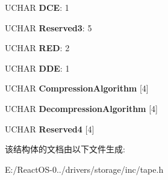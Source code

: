 \begin{DoxyCompactItemize}
U\+C\+H\+AR {\bfseries D\+CE}\+: 1
\item 
\mbox{\label{struct___m_o_d_e___d_a_t_a___c_o_m_p_r_e_s_s_i_o_n___p_a_g_e_a5013be5212448b5da50a08f44ed4dbeb}} 
U\+C\+H\+AR {\bfseries Reserved3}\+: 5
\item 
\mbox{\label{struct___m_o_d_e___d_a_t_a___c_o_m_p_r_e_s_s_i_o_n___p_a_g_e_ad42e2e7f6774e767a16f58d236a2a125}} 
U\+C\+H\+AR {\bfseries R\+ED}\+: 2
\item 
\mbox{\label{struct___m_o_d_e___d_a_t_a___c_o_m_p_r_e_s_s_i_o_n___p_a_g_e_aec27f7632a5614532eafcc2b62c21a44}} 
U\+C\+H\+AR {\bfseries D\+DE}\+: 1
\item 
\mbox{\label{struct___m_o_d_e___d_a_t_a___c_o_m_p_r_e_s_s_i_o_n___p_a_g_e_a866231c86084c28e58e5413b79b0c647}} 
U\+C\+H\+AR {\bfseries Compression\+Algorithm} \mbox{[}4\mbox{]}
\item 
\mbox{\label{struct___m_o_d_e___d_a_t_a___c_o_m_p_r_e_s_s_i_o_n___p_a_g_e_a8d03ad06e133dd6a0073012d0d5cb537}} 
U\+C\+H\+AR {\bfseries Decompression\+Algorithm} \mbox{[}4\mbox{]}
\item 
\mbox{\label{struct___m_o_d_e___d_a_t_a___c_o_m_p_r_e_s_s_i_o_n___p_a_g_e_a1723c43d56efe904d3d242119fe087a7}} 
U\+C\+H\+AR {\bfseries Reserved4} \mbox{[}4\mbox{]}
\end{DoxyCompactItemize}


该结构体的文档由以下文件生成\+:\begin{DoxyCompactItemize}
\item 
E\+:/\+React\+O\+S-\/0../drivers/storage/inc/tape.\+h\end{DoxyCompactItemize}
